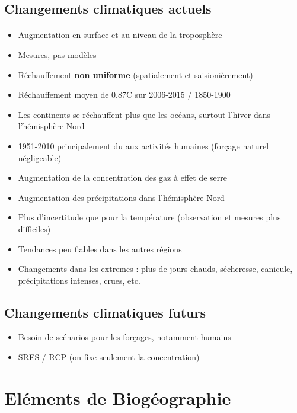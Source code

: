 \documentclass {article}
\begin{document}
\subsection{Changements climatiques actuels}

\paragraph{}
\begin{itemize}
\item Augmentation en surface et au niveau de la troposphère
\item Mesures, pas modèles
\item Réchauffement \textbf{non uniforme} (spatialement et saisionièrement)
\item Réchauffement moyen de 0.87\textdegree C sur 2006-2015 / 1850-1900
\item Les continents se réchauffent plus que les océans, surtout l'hiver dans l'hémisphère Nord
\item 1951-2010 principalement du aux activités humaines (forçage naturel négligeable)
\item Augmentation de la concentration des gaz à effet de serre
\\
\item Augmentation des précipitations dans l'hémisphère Nord
\item Plus d'incertitude que pour la température (observation et mesures plus difficiles)
\item Tendances peu fiables dans les autres régions
\\
\item Changements dans les extremes : plus de jours chauds, sécheresse, canicule, précipitations intenses, crues, etc.
\end{itemize}

\subsection{Changements climatiques futurs}

\begin{itemize}
\item Besoin de scénarios pour les forçages, notamment humains
\item SRES / RCP (on fixe seulement la concentration)
\end{itemize}
\bigskip

\section{Eléments de Biogéographie}
\end{document}

